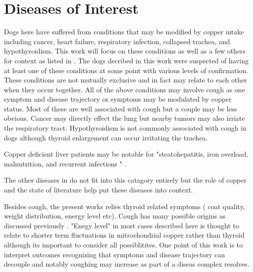 \mjmworth


\section{  Diseases of Interest }

Dogs here have suffered from 
conditions that may be modified by copper intake including  
cancer, heart failure, respiratory infection, collapsed
trachea, and hypothyroidism. 
 This work will focus on these conditions as
well as a few others for context as listed in . 
The dogs decribed in this work were suspected of having
at least one of these conditions at some point with
various levels of confirmation. 
These conditions
are not mutually exclusive and in fact may relate to each
other when they occur together. 
All of the above conditions may involve cough as one symptom
and disease trajectory or symptoms may be modulated by
copper status. 
Most of these are well associated with cough but 
a couple may be less obvious. 
Cancer may directly effect the lung but nearby tumors
may also irriate the respiratory tract. 
Hypothyroidism is
not commonly associated with cough in dogs although
thyroid enlargement can occur irritating the trachea. 

Copper deficient liver patients 
may be  notable for
"steatohepatitis, iron overload, malnutrition, and recurrent infections "
\cite{Yu_Liou_Biggins_Copper_Deficiency_Liver_2019}.

The other diseases in  do not fit into
this catagory entirely but the role of copper and the state
of literature help put these diseases into context. 

Besides cough, the present works relies  thyroid related
symptoms ( coat quality, weight distribution, energy level etc).
Cough has many possible origins as discussed previously
\cite{mmarchywka-MJM-2019-001-.1rg}.  "Enegy level"
in most cases described here is thought to relate to 
shorter term fluctuations in mitrochondrial copper
rather than thyroid although its important to consider
all possiblitites. One point of this work is to 
interpret outcomes recognizing that symptoms and disease
trajectory can decouple and notably coughing may increase
as part of a diseas complex resolves.   

